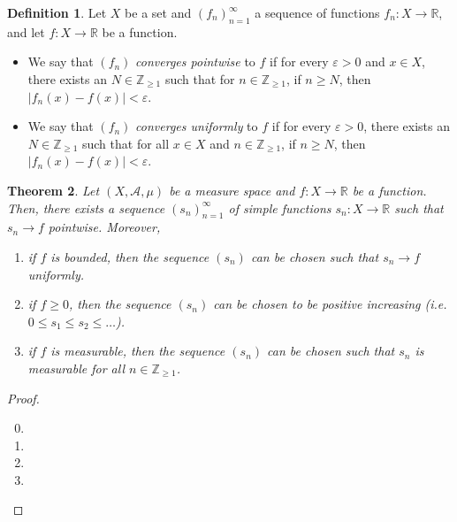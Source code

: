 \documentclass[a4paper, openany]{memoir}
\theoremstyle{definition}
\newtheorem{definition}{Definition}[section]
\theoremstyle{plain}
\newtheorem{theorem}[definition]{Theorem}
\begin{document}
    \begin{definition}
        Let $X$ be a set and $(f_n)_{n=1}^\infty$ a sequence of functions $f_n \colon X \to \mathbb{R}$, and let $f \colon X \to \mathbb{R}$ be a function. 
        \begin{itemize}
            \item We say that $(f_n)$ \emph{converges pointwise} to $f$ if for every $\varepsilon > 0$ and $x \in X$, there exists an $N \in \mathbb{Z}_{\geq 1}$ such that for $n \in \mathbb{Z}_{\geq 1}$, if $n \geq N$, then $|f_n(x) - f(x)| < \varepsilon$.
            \item We say that $(f_n)$ \emph{converges uniformly} to $f$ if for every $\varepsilon > 0$, there exists an $N \in \mathbb{Z}_{\geq 1}$ such that for all $x \in X$ and $n \in \mathbb{Z}_{\geq 1}$, if $n \geq N$, then $|f_n(x) - f(x)| < \varepsilon$.
        \end{itemize}
    \end{definition}

    \begin{theorem}
        Let $(X, \mathcal{A}, \mu)$ be a measure space and $f \colon X \to \mathbb{R}$ be a function. Then, there exists a sequence $(s_n)_{n=1}^\infty$ of simple functions $s_n \colon X \to \mathbb{R}$ such that $s_n \to f$ pointwise. Moreover,
        \begin{enumerate}
            \item if $f$ is bounded, then the sequence $(s_n)$ can be chosen such that $s_n \to f$ uniformly.
            \item if $f \geq 0$, then the sequence $(s_n)$ can be chosen to be positive increasing (i.e. $0 \leq s_1 \leq s_2 \leq \dots$).
            \item if $f$ is measurable, then the sequence $(s_n)$ can be chosen such that $s_n$ is measurable  for all $n \in \mathbb{Z}_{\geq 1}$.
        \end{enumerate}
    \end{theorem}
    \begin{proof}
        \hspace*{0pt}
        \begin{enumerate}
            \setcounter{enumi}{-1}
            \item 
            
            \item 
            
            \item 
            
            \item 
        \end{enumerate}
    \end{proof}
\end{document}
